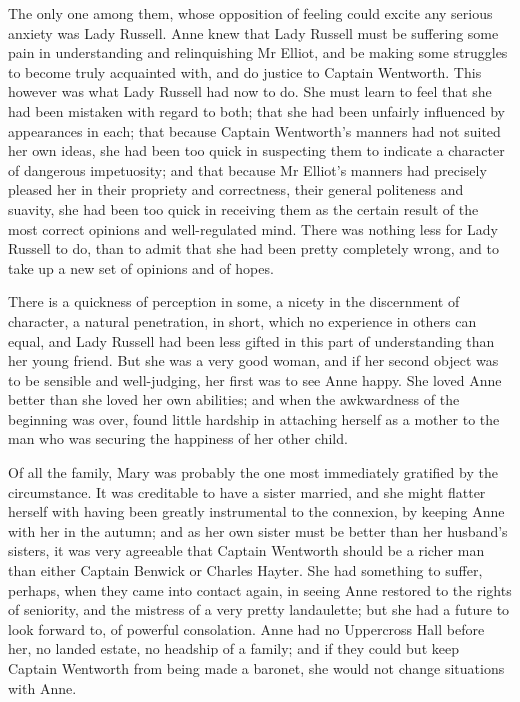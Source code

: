 The only one among them, whose opposition of feeling could excite any serious anxiety was Lady Russell. Anne knew that Lady Russell must be suffering some pain in understanding and relinquishing Mr Elliot, and be making some struggles to become truly acquainted with, and do justice to Captain Wentworth. This however was what Lady Russell had now to do. She must learn to feel that she had been mistaken with regard to both; that she had been unfairly influenced by appearances in each; that because Captain Wentworth's manners had not suited her own ideas, she had been too quick in suspecting them to indicate a character of dangerous impetuosity; and that because Mr Elliot's manners had precisely pleased her in their propriety and correctness, their general politeness and suavity, she had been too quick in receiving them as the certain result of the most correct opinions and well-regulated mind. There was nothing less for Lady Russell to do, than to admit that she had been pretty completely wrong, and to take up a new set of opinions and of hopes.

There is a quickness of perception in some, a nicety in the discernment of character, a natural penetration, in short, which no experience in others can equal, and Lady Russell had been less gifted in this part of understanding than her young friend. But she was a very good woman, and if her second object was to be sensible and well-judging, her first was to see Anne happy. She loved Anne better than she loved her own abilities; and when the awkwardness of the beginning was over, found little hardship in attaching herself as a mother to the man who was securing the happiness of her other child.

Of all the family, Mary was probably the one most immediately gratified by the circumstance. It was creditable to have a sister married, and she might flatter herself with having been greatly instrumental to the connexion, by keeping Anne with her in the autumn; and as her own sister must be better than her husband's sisters, it was very agreeable that Captain Wentworth should be a richer man than either Captain Benwick or Charles Hayter. She had something to suffer, perhaps, when they came into contact again, in seeing Anne restored to the rights of seniority, and the mistress of a very pretty landaulette; but she had a future to look forward to, of powerful consolation. Anne had no Uppercross Hall before her, no landed estate, no headship of a family; and if they could but keep Captain Wentworth from being made a baronet, she would not change situations with Anne.

